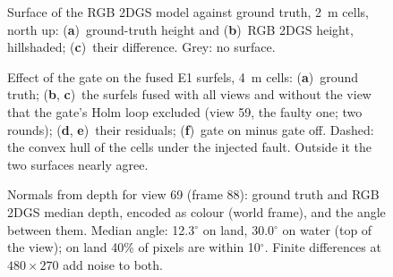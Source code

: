 \begin{figure}[!htbp]
\centering

\caption{Surface of the RGB 2DGS model against ground truth, 2~m cells, north up: (\textbf{a})~ground-truth
height and (\textbf{b})~RGB 2DGS height, hillshaded; (\textbf{c})~their difference. Grey: no surface.}
\label{fig:surfacergb}
\end{figure}

\begin{figure}[!htbp]
\centering

\caption{Effect of the gate on the fused E1 surfels, 4~m cells: (\textbf{a})~ground truth; (\textbf{b}, \textbf{c})~the
surfels fused with all views and without the view that the gate's Holm loop excluded (view 59, the
faulty one; two rounds); (\textbf{d}, \textbf{e})~their residuals; (\textbf{f})~gate on minus gate off. Dashed: the
convex hull of the cells under the injected fault. Outside it the two surfaces nearly agree.}
\label{fig:surfacegate}
\end{figure}

\begin{figure}[!htbp]
\centering

\caption{Normals from depth for view 69 (frame 88): ground truth and RGB 2DGS median depth, encoded as
colour (world frame), and the angle between them. Median angle: 12.3$^{\circ}$ on land, 30.0$^{\circ}$ on water
(top of the view); on land 40\% of pixels are within 10$^{\circ}$. Finite differences at $480\times270$ add
noise to both.}
\label{fig:surfacenormals}
\end{figure}
\FloatBarrier

